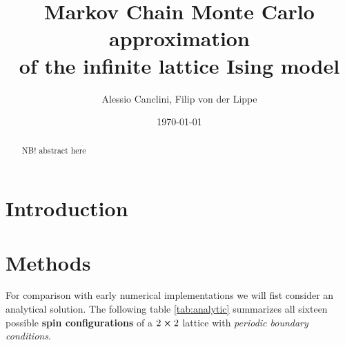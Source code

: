 \documentclass[english,notitlepage,reprint,nofootinbib]{revtex4-1}  %
\begin{document}
\title{Markov Chain Monte Carlo approximation \\of the infinite lattice Ising model}  %
\author{Alessio Canclini, Filip von der Lippe} %
\date{\today}                             %
\noaffiliation                            %

\begin{abstract}
    NB! abstract here
\end{abstract}
\maketitle


\section{Introduction}


\section{Methods}\label{sec:methods}
For comparison with early numerical implementations we will fist consider an analytical solution. The following table \ref*{tab:analytic} summarizes all sixteen possible \textbf{spin configurations} of a $2 \cross 2$ lattice with \textit{periodic boundary conditions}.
\end{document}
